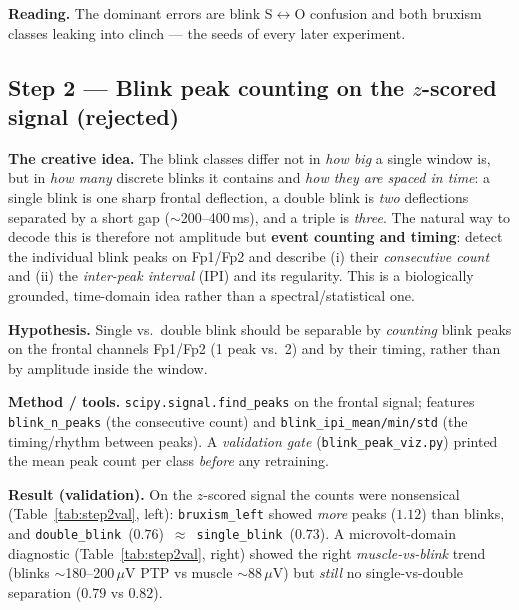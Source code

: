 \documentclass[11pt,a4paper]{article}
\newcommand{\muv}{$\mu$V}
\newcommand{\code}[1]{\texttt{#1}}
\begin{document}
\noindent
\textbf{Reading.} The dominant errors are blink S$\leftrightarrow$O confusion and
both bruxism classes leaking into clinch --- the seeds of every later experiment.

\subsection{Step 2 --- Blink peak counting on the $z$-scored signal (rejected)}
\label{sec:step2}
\textbf{The creative idea.} The blink classes differ not in \emph{how big} a
single window is, but in \emph{how many} discrete blinks it contains and
\emph{how they are spaced in time}: a single blink is one sharp frontal
deflection, a double blink is \emph{two} deflections separated by a short gap
($\sim$200--400\,ms), and a triple is \emph{three}. The natural way to decode this
is therefore not amplitude but \textbf{event counting and timing}: detect the
individual blink peaks on Fp1/Fp2 and describe (i) their \emph{consecutive count}
and (ii) the \emph{inter-peak interval} (IPI) and its regularity. This is a
biologically grounded, time-domain idea rather than a spectral/statistical one.

\textbf{Hypothesis.} Single vs.\ double blink should be separable by
\emph{counting} blink peaks on the frontal channels Fp1/Fp2 (1 peak vs.\ 2) and
by their timing, rather than by amplitude inside the window.

\textbf{Method / tools.} \code{scipy.signal.find\_peaks} on the frontal signal;
features \code{blink\_n\_peaks} (the consecutive count) and
\code{blink\_ipi\_mean/min/std} (the timing/rhythm between peaks). A
\emph{validation gate} (\code{blink\_peak\_viz.py}) printed the mean peak count
per class \emph{before} any retraining.

\textbf{Result (validation).} On the $z$-scored signal the counts were
nonsensical (Table~\ref{tab:step2val}, left): \code{bruxism\_left} showed
\emph{more} peaks ($1.12$) than blinks, and
\code{double\_blink}~($0.76$)~$\approx$~\code{single\_blink}~($0.73$). A
microvolt-domain diagnostic (Table~\ref{tab:step2val}, right) showed the right
\emph{muscle-vs-blink} trend (blinks $\sim$180--200\,\muv{} PTP vs muscle
$\sim$88\,\muv) but \emph{still} no single-vs-double separation ($0.79$ vs
$0.82$).
\end{document}
